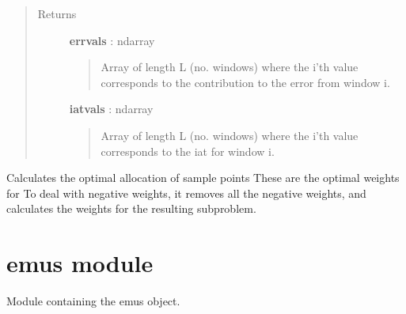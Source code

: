 \documentclass[letterpaper,10pt,english]{sphinxmanual}
\begin{document}
\begin{fulllineitems}
\begin{quote}
\begin{description}
\item[{Returns}] \leavevmode
\textbf{errvals} : ndarray
\begin{quote}

Array of length L (no. windows) where the i'th value corresponds to the contribution to the error from window i.
\end{quote}

\textbf{iatvals} : ndarray
\begin{quote}

Array of length L (no. windows) where the i'th value corresponds to the iat for window i.
\end{quote}

\end{description}\end{quote}

\end{fulllineitems}


\begin{fulllineitems}
\label{modules/avar:avar.getAllocations}
Calculates the optimal allocation of sample points 
These are the optimal weights for 
To deal with negative weights, it removes all the negative weights, and calculates the weights for the resulting subproblem.

\end{fulllineitems}



\section{emus module}
\label{modules/emus:emus-module}\label{modules/emus:module-emus}\label{modules/emus::doc}
Module containing the emus object.
\end{document}
